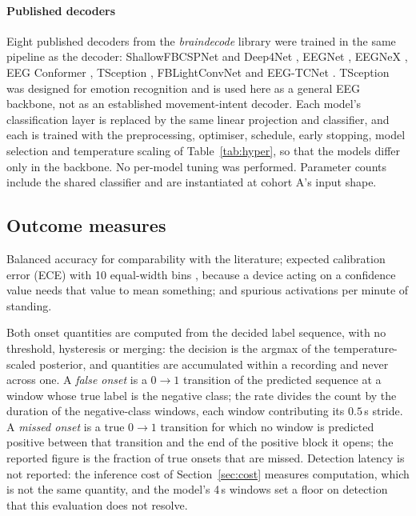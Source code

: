 \documentclass[a4paper,fleqn]{cas-dc}
\begin{document}
\paragraph{Published decoders} Eight published decoders from the
\textit{braindecode} library \citep{braindecode_lib} were trained in the same
pipeline as the decoder: ShallowFBCSPNet and Deep4Net
\citep{schirrmeister}, EEGNet \citep{lawhern}, EEGNeX \citep{eegnex}, EEG
Conformer \citep{conformer}, TSception \citep{tsception}, FBLightConvNet
\citep{lightconvnet} and EEG-TCNet \citep{eegtcnet}. TSception was designed for
emotion recognition and is used here as a general EEG backbone, not as an
established movement-intent decoder. Each model's classification layer is replaced by the
same linear projection and classifier, and each is trained with the
preprocessing, optimiser, schedule, early stopping, model selection and
temperature scaling of Table~\ref{tab:hyper}, so that the models differ only in
the backbone. No per-model tuning was performed. Parameter counts include the
shared classifier and are instantiated at cohort A's input shape.

\subsection{Outcome measures}
\label{sec:outcomes}

Balanced accuracy for comparability with the literature; expected calibration
error (ECE) with 10 equal-width bins \citep{naeini}, because a device acting on
a confidence value needs that value to mean something; and spurious activations per minute of standing.

Both onset quantities are computed from the decided label sequence, with no
threshold, hysteresis or merging: the decision is the argmax of the
temperature-scaled posterior, and quantities are accumulated within a recording
and never across one. A \emph{false onset} is a $0 \rightarrow 1$ transition of
the predicted sequence at a window whose true label is the negative class; the
rate divides the count by the duration of the negative-class windows, each
window contributing its $0.5$\,s stride. A \emph{missed onset} is a true
$0 \rightarrow 1$ transition for which no window is predicted positive between
that transition and the end of the positive block it opens; the reported figure
is the fraction of true onsets that are missed. Detection latency is not reported: the inference cost of Section~\ref{sec:cost} measures computation, which is not the same quantity, and the model's 4\,s windows set a floor on detection that this evaluation does not resolve.
\end{document}

